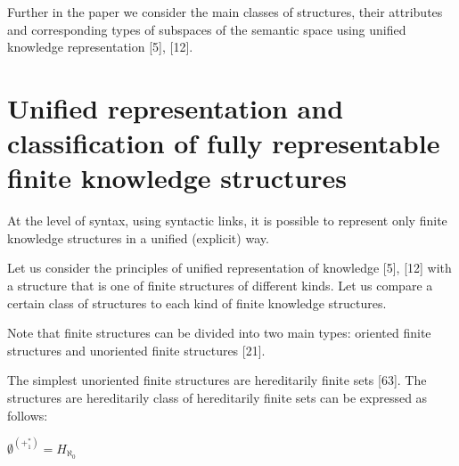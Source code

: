 \documentclass[10pt, a4paper]{article}
\begin{document}
\begin{multicols}{2}
Further in the paper we consider the main classes of
structures, their attributes and corresponding types of
subspaces of the semantic space using unified knowledge
representation [5], [12].
\section{ Unified representation and classification of fully
representable finite knowledge structures}

At the level of syntax, using syntactic links, it is
possible to represent only finite knowledge structures in
a unified (explicit) way.

Let us consider the principles of unified representation
of knowledge [5], [12] with a structure that is one of finite
structures of different kinds. Let us compare a certain
class of structures to each kind of finite knowledge
structures.

Note that finite structures can be divided into two main
types: oriented finite structures and unoriented finite
structures [21].

The simplest unoriented finite structures are hereditarily finite sets [63]. The structures are hereditarily class of hereditarily finite sets
can be expressed as follows:

\vspace{0.2cm}
\begin{center}
$\emptyset^{(+^{*}_{1})}=H_{\aleph_{0}}$
\end{center}
\end{multicols}
\end{document}
